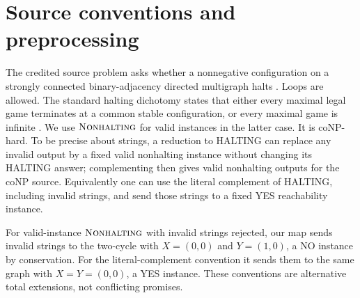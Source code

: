 \documentclass[11pt]{article}
\newcommand{\nh}{\textsc{Nonhalting}}
\begin{document}
\section{Source conventions and preprocessing}\label{sec:source}
The credited source problem asks whether a nonnegative configuration on
a strongly connected binary-adjacency directed multigraph halts
\cite{FL}. Loops are allowed. The standard halting dichotomy states that
either every maximal legal game terminates at a common stable
configuration, or every maximal game is infinite
\cite[Theorem 1]{HKT}. We use $\nh$ for valid instances in the latter
case. It is coNP-hard. To be precise about strings, a reduction to
HALTING can replace any invalid output by a fixed valid nonhalting
instance without changing its HALTING answer; complementing then gives
valid nonhalting outputs for the coNP source. Equivalently one can use
the literal complement of HALTING, including invalid strings, and send
those strings to a fixed YES reachability instance.

For valid-instance $\nh$ with invalid strings rejected, our map sends
invalid strings to the two-cycle with $X=(0,0)$ and $Y=(1,0)$, a NO
instance by conservation. For the literal-complement convention it
sends them to the same graph with $X=Y=(0,0)$, a YES instance. These
conventions are alternative total extensions, not conflicting promises.
\end{document}
